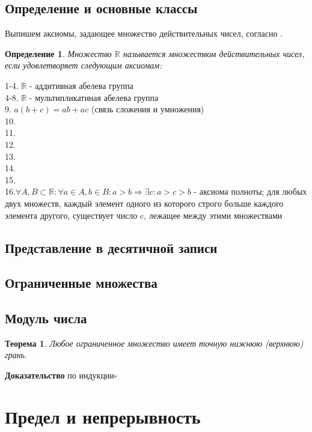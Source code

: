 \documentclass[a4paper]{article}
\newtheorem{defin}{Определение}
\newtheorem{theor}{Теорема}
\begin{document}
\subsection{Определение и основные классы}
Выпишем аксиомы, задающее множество действительных чисел, согласно \cite{z}.
\begin{defin}
Множество $\mathbb R$ называется множеством действительных чисел, если 
удовлетворяет следующим аксиомам:
\end{defin}
1-4. $\mathbb R$ - аддитивная абелева группа\\
4-8. $\mathbb R$ - мультипликатиная абелева группа\\
9. $a(b+c)=ab+ac$ (связь сложения и умножения)\\
10.\\
11.\\
12.\\
13.\\
14.\\
15.\\
16.$\forall A,B\subset\mathbb R\colon \forall a\in A, b\in B\colon 
a>b\Rightarrow\exists c\colon a>c>b$ - аксиома полноты; для любых двух 
множеств, каждый элемент одного из которого строго больше каждого элемента 
другого, существует число c, лежащее между этими множествами \\

\subsection{Представление в десятичной записи}

\subsection{Ограниченные множества}
\subsection{Модуль числа}
\begin{theor}
Любое ограниченное множество имеет точную нижнюю (верхнюю) грань.
\end{theor}
\textbf{Доказательство} по индукции$\square$


\section{Предел и непрерывность}
\end{document}
